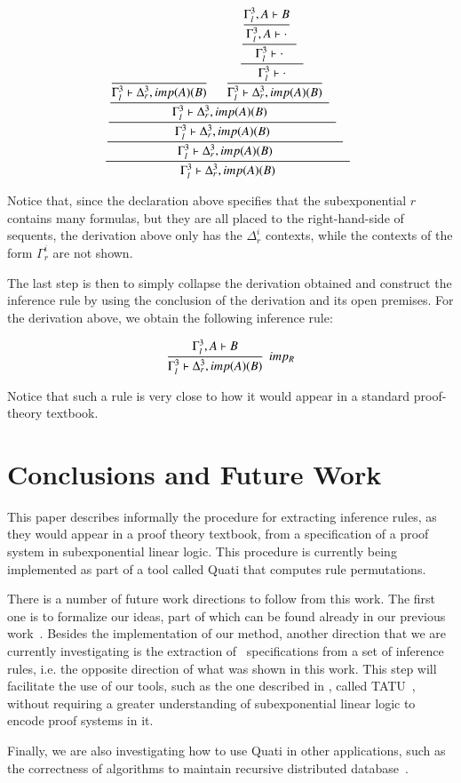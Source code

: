 \documentclass[a4paper,10pt]{article}
\begin{document}
{\small\[\cfrac{\cfrac{\cfrac{\cfrac{\cfrac{}
{\Gamma_{l}^{3}  \vdash \Delta_{r}^{3}, imp (A) (B)  } \;\; 
\quad
\cfrac{\cfrac{\cfrac{\cfrac{\Gamma_{l}^{3}, A  \vdash B }
{\Gamma_{l}^{3}, A  \vdash  \cdot } \;\; }
{\Gamma_{l}^{3}  \vdash  \cdot } \;\; }
{\Gamma_{l}^{3}  \vdash  \cdot } \;\; }
{\Gamma_{l}^{3}  \vdash \Delta_{r}^{3}, imp (A) (B)  } \;\; }
{\Gamma_{l}^{3}  \vdash \Delta_{r}^{3}, imp (A) (B)  } \;\; }
{\Gamma_{l}^{3}  \vdash \Delta_{r}^{3}, imp (A) (B)  } \;\; }
{\Gamma_{l}^{3}  \vdash \Delta_{r}^{3}, imp (A) (B)  } \;\; }
{\Gamma_{l}^{3}  \vdash \Delta_{r}^{3}, imp (A) (B)  } \;\; \]}

Notice that, since the declaration above specifies that the subexponential $r$ contains
many formulas, but they are all placed to the right-hand-side of sequents, the derivation 
above only has the $\Delta_r^i$ contexts, while the contexts of the form $\Gamma_r^i$ are not
shown.

The last step is then to simply collapse the derivation obtained and construct the 
inference rule by using the conclusion of the derivation and its open premises. 
For the derivation above, we obtain the following inference rule:

{\small \[\cfrac{\Gamma_{l}^{3}, A  \vdash B }
{\Gamma_{l}^{3}  \vdash \Delta_{r}^{3}, imp (A) (B)  } \;\; imp_{R}\]}

Notice that such a rule is very close to how it would appear in a standard proof-theory 
textbook.

\section{Conclusions and Future Work}

This paper describes informally the procedure for extracting inference rules, as
they would appear in a proof theory textbook, from a specification of a proof system in 
subexponential linear logic. This procedure is currently being implemented
as part of a tool called Quati that computes rule permutations.

There is a number of future work directions to follow from this work. The first one is to 
formalize our ideas, part of which can be found already in our previous
work~\cite{nigam13iclp}. Besides the implementation of our method, another
direction that we are currently investigating is the extraction of \sell\
specifications from a set of inference rules, i.e. the opposite direction of
what was shown in this work. This step will facilitate the use of our tools, such as the one described
in \cite{nigam.jlc}, called TATU~\cite{tatu}, without requiring a greater
understanding of subexponential linear logic to encode proof systems in it.

Finally, we are also investigating how to use Quati in other applications, such as
the correctness of algorithms to maintain recursive distributed database~\cite{nigam12comlan}.



\end{document}
